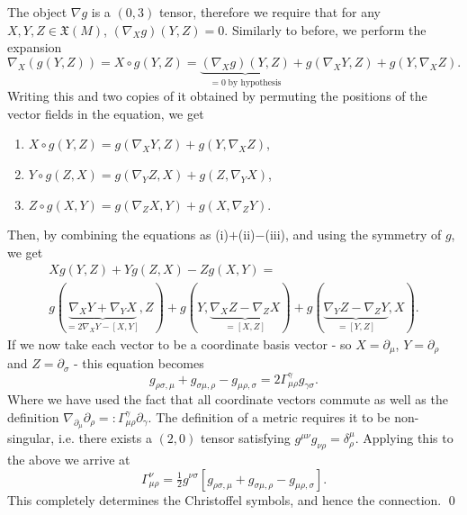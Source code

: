 \documentclass[11pt,fleqn]{report}
\begin{document}
The object $\nabla g$ is a $(0,3)$ tensor, therefore we require that for any $X,Y,Z \in \mathfrak{X}(M)$, $(\nabla_Xg)(Y,Z)=0$. Similarly to before, we perform the expansion
	\begin{equation}
		\nabla_X(g(Y,Z)) = X\circ g(Y,Z) = \underbrace{(\nabla_Xg)(Y,Z)}_{=0 \; \text{by hypothesis}} + g(\nabla_XY,Z) + g(Y,\nabla_XZ).
	\end{equation}
Writing this and two copies of it obtained by permuting the positions of the vector fields in the equation, we get
	\begin{enumerate}[label=(\roman*), labelindent=0pt]
		\item $X\circ g(Y,Z) = g(\nabla_XY,Z) + g(Y,\nabla_XZ)$,
		\item $Y\circ g(Z,X) = g(\nabla_YZ,X) + g(Z,\nabla_YX)$,
		\item $Z\circ g(X,Y) = g(\nabla_ZX,Y) + g(X,\nabla_ZY)$.
	\end{enumerate}
Then, by combining the equations as (i)$+$(ii)$-$(iii), and using the symmetry of $g$, we get
	\begin{equation}
		\begin{split}
			X g(Y,Z)+Y g(Z,X)-Z g(X,Y) =  \\
			g(\underbrace{\nabla_XY+\nabla_YX}_{=2\nabla_XY-[X,Y]},Z) + g(Y,\underbrace{\nabla_XZ- \nabla_ZX}_{=[X,Z]})+ g(\underbrace{\nabla_YZ-\nabla_ZY}_{=[Y,Z]},X).
		\end{split}
	\end{equation}
If we now take each vector to be a coordinate basis vector - so $X=\partial_\mu$, $Y=\partial_\rho$ and $Z=\partial_\sigma$ - this equation becomes
	\begin{equation}
		g_{\rho\sigma,\mu} + g_{\sigma\mu,\rho} -g_{\mu\rho,\sigma} = 2\Gamma_{\mu\rho}^\gamma g_{\gamma\sigma}.
	\end{equation}
Where we have used the fact that all coordinate vectors commute as well as the definition $\nabla_{\partial_\mu}\partial_\rho =:\Gamma^\gamma_{\mu\rho}\partial_\gamma$. The definition of a metric requires it to be non-singular, i.e. there exists a $(2,0)$ tensor satisfying $g^{\mu\nu}g_{\nu\rho} = \delta^\mu_\rho$. Applying this to the above we arrive at
	\begin{equation}
		\Gamma^\nu_{\mu\rho} = \tfrac{1}{2}g^{\nu\sigma}\left[g_{\rho\sigma,\mu} + g_{\sigma\mu,\rho} -g_{\mu\rho,\sigma}\right].
	\end{equation}
This completely determines the Christoffel symbols, and hence the connection. \qed
\end{document}
